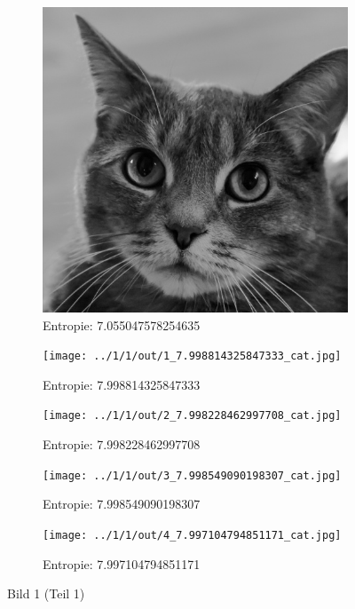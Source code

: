 \begin{figure}
	\centering

	\begin{subfigure}{0.25\textwidth}
		\includegraphics[width=\textwidth]{../1/3/gray_7.055047578254635_cat.jpg}
		\caption{Entropie: 7.055047578254635}
	\end{subfigure}

	\begin{subfigure}{0.25\textwidth}
		\texttt{[image: ../1/1/out/1\_7.998814325847333\_cat.jpg]}
		\caption{Entropie: 7.998814325847333}
	\end{subfigure}

	\begin{subfigure}{0.25\textwidth}
		\texttt{[image: ../1/1/out/2\_7.998228462997708\_cat.jpg]}
		\caption{Entropie: 7.998228462997708}
	\end{subfigure}

	\begin{subfigure}{0.25\textwidth}
		\texttt{[image: ../1/1/out/3\_7.998549090198307\_cat.jpg]}
		\caption{Entropie: 7.998549090198307}
	\end{subfigure}

	\begin{subfigure}{0.25\textwidth}
		\texttt{[image: ../1/1/out/4\_7.997104794851171\_cat.jpg]}
		\caption{Entropie: 7.997104794851171}
	\end{subfigure}
	\caption{Bild 1 (Teil 1)}
	\label{start}
\end{figure}
